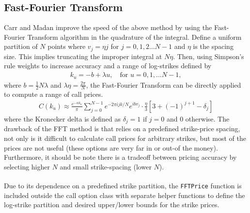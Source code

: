 \documentclass[11pt]{article}
\begin{document}
		\subsection{Fast-Fourier Transform}
		Carr and Madan improve the speed of the above method by using the Fast-Fourier Transform algorithm in the quadrature of the integral. Define a uniform partition of \( N \) points where \( v_{j} = \eta j \) for \( j = 0,1,2... N - 1 \) and \( \eta \) is the spacing size. This implies truncating the improper integral at \( N\eta \). Then, using Simpson's rule weights to increase accuracy and a range of log-strikes defined by
		\begin{align*}
		k_{u} = -b + \lambda u,\quad\text{for }u=0,1,...N-1,
		\end{align*}
		where \( b = \frac{1}{2}N\lambda \) and \( \lambda \eta = \frac{2\pi}{N} \), the Fast-Fourier Transform can be directly applied to compute a range of call prices. 
		\begin{align*}
		C(k_{u})\approx \frac{e^{-\alpha k_u}}{\pi}\sum_{j = 0}^{N-1}e^{-2\pi i j k/ N}e^{ibv_j}\cdot\frac{\eta}{3}\left[3 + (-1)^{j+1} - \delta_{j}\right]
		\end{align*}
		where the Kronecker delta is defined as \( \delta_{j} = 1 \) if \( j = 0 \) and \( 0 \) otherwise. The drawback of the FFT method is that relies on a predefined strike-price spacing, not only is it difficult to calculate call prices for arbitrary strikes, but most of the prices are not useful (these options are very far in or out-of the money). Furthermore, it should be note there is a tradeoff between pricing accuracy by selecting higher \( N \) and small strike-spacing (lower \( N \)).\\\\ Due to its dependence on a predefined strike partition, the \colorbox{gray!25}{\texttt{FFTPrice}} function is included outside the call option class with separate helper functions to define the log-strike partition and desired upper/lower bounds for the strike prices.
\end{document}
